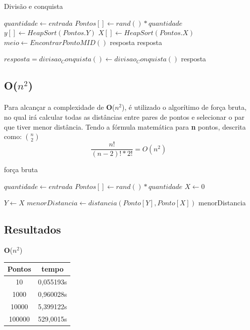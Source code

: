 \documentclass[12pt]{article}
\begin{document}
\begin{algorithm}
\caption{Divisão e conquista}\label{alg:cap}
\begin{algorithmic}
\State $quantidade \gets entrada$
\State $Pontos[] \gets rand()*quantidade $
\State $y[ ] \gets HeapSort(Pontos.Y)$
\State $X[ ] \gets HeapSort(Pontos.X)$
\State $meio \gets EncontrarPontoMID()$
        \RETURN resposta
    \RETURN resposta

    
\EndIf
\State $ resposta =divisao_Conquista() \gets divisao_Conquista()$
\EndWhile
 \RETURN resposta
\end{algorithmic}
\end{algorithm}



\subsection{\textbf{O}($n^{2}$)}

   \paragraph{} Para alcançar a complexidade de \textbf{O}($n^{2}$), é utilizado o algorítimo de força bruta, no qual irá calcular todas as distâncias entre pares de pontos e selecionar o par que tiver menor distância.
Tendo a fórmula matemática para \textbf{n} pontos, descrita como: 	$\binom{n}{2}$
\[\frac{n!}{(n-2)!*2!}  = O(n^2) \]

\begin{algorithm}
\caption{força bruta}\label{alg:cap}
\begin{algorithmic}
\State $quantidade \gets entrada$
\State $Pontos[] \gets rand()*quantidade $
\State $X \gets 0$

\State $Y \gets X$
    \State $menorDistancia \gets distancia(Ponto[Y],Ponto[X])$
\EndIf
\ENDFOR
\EndWhile
 \RETURN menorDistancia
\end{algorithmic}
\end{algorithm}


\subsection{Resultados}

 \begin{center}
    

\textbf{O}($n^{2}$)

\begin{tabular}{||c c  ||} 

 \hline
 Pontos & tempo \\ [0.6ex] 
 \hline\hline
  10& 0,055193s  \\ 
 \hline
 1000 & 0,960028s \\
 \hline
 10000 & 5,399122s \\
 \hline
 100000 & 529,0015s \\ [1ex] 
 \hline
\end{tabular}

\end{center}
\end{document}
